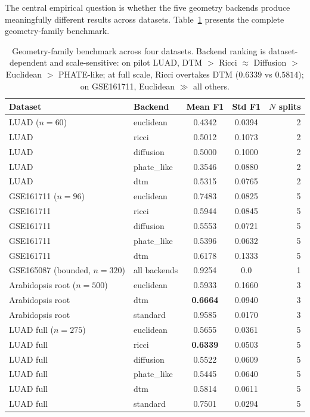 \documentclass[12pt]{article}
\begin{document}
The central empirical question is whether the five geometry backends produce meaningfully different results across datasets.
Table~\ref{tab:geobench} presents the complete geometry-family benchmark.

\begin{table}[h]
\centering
\small
\begin{tabular}{@{}llccr@{}}
\toprule
Dataset & Backend & Mean F1 & Std F1 & $N$ splits \\
\midrule
LUAD ($n=60$) & euclidean & 0.4342 & 0.0394 & 2 \\
LUAD & ricci & 0.5012 & 0.1073 & 2 \\
LUAD & diffusion & 0.5000 & 0.1000 & 2 \\
LUAD & phate\_like & 0.3546 & 0.0880 & 2 \\
LUAD & dtm & 0.5315 & 0.0765 & 2 \\
\midrule
GSE161711 ($n=96$) & euclidean & 0.7483 & 0.0825 & 5 \\
GSE161711 & ricci & 0.5944 & 0.0845 & 5 \\
GSE161711 & diffusion & 0.5553 & 0.0721 & 5 \\
GSE161711 & phate\_like & 0.5396 & 0.0632 & 5 \\
GSE161711 & dtm & 0.6178 & 0.1333 & 5 \\
\midrule
GSE165087 (bounded, $n=320$) & all backends & 0.9254 & 0.0 & 1 \\
\midrule
Arabidopsis root ($n=500$) & euclidean & 0.5933 & 0.1660 & 3 \\
Arabidopsis root & dtm & \textbf{0.6664} & 0.0940 & 3 \\
Arabidopsis root & standard & 0.9585 & 0.0170 & 3 \\
\midrule
LUAD full ($n=275$) & euclidean & 0.5655 & 0.0361 & 5 \\
LUAD full & ricci & \textbf{0.6339} & 0.0503 & 5 \\
LUAD full & diffusion & 0.5522 & 0.0609 & 5 \\
LUAD full & phate\_like & 0.5445 & 0.0640 & 5 \\
LUAD full & dtm & 0.5814 & 0.0611 & 5 \\
LUAD full & standard & 0.7501 & 0.0294 & 5 \\
\bottomrule
\end{tabular}
\caption{Geometry-family benchmark across four datasets.
Backend ranking is dataset-dependent and scale-sensitive: on pilot LUAD, DTM $>$ Ricci $\approx$ Diffusion $>$ Euclidean $>$ PHATE-like; at full scale, Ricci overtakes DTM ($0.6339$ vs $0.5814$); on GSE161711, Euclidean $\gg$ all others.}
\label{tab:geobench}
\end{table}
\end{document}

